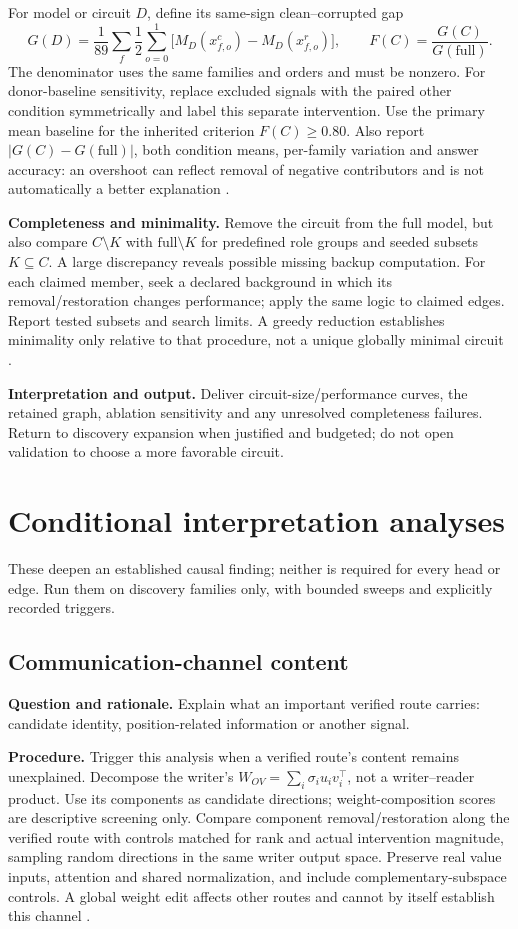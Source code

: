 \documentclass[11pt,a4paper]{article}
\newcommand{\purpose}{\textbf{Question and rationale.} }
\newcommand{\procedure}{\textbf{Procedure.} }
\newcommand{\interpretation}{\textbf{Interpretation and output.} }
\begin{document}
For model or circuit $D$, define its same-sign clean--corrupted gap
\[
 G(D)=\frac1{89}\sum_f\frac12\sum_{o=0}^{1}
 \bigl[M_D(x^c_{f,o})-M_D(x^r_{f,o})\bigr],\qquad
 F(C)=\frac{G(C)}{G(\mathrm{full})}.
\]
The denominator uses the same families and orders and must be nonzero.
For donor-baseline sensitivity, replace excluded signals with the paired other
condition symmetrically and label this separate intervention. Use the primary
mean baseline for the inherited criterion $F(C)\geq0.80$. Also report
$|G(C)-G(\mathrm{full})|$, both condition means, per-family variation and answer
accuracy: an overshoot can reflect removal of negative contributors and is not
automatically a better explanation \cite{faith}.

\textbf{Completeness and minimality.} Remove the circuit from the full model,
but also compare $C\setminus K$ with $\mathrm{full}\setminus K$ for predefined
role groups and seeded subsets $K\subseteq C$. A large discrepancy reveals
possible missing backup computation. For each claimed member, seek a declared
background in which its removal/restoration changes performance; apply the same
logic to claimed edges. Report tested subsets and search limits. A greedy
reduction establishes minimality only relative to that procedure, not a unique
globally minimal circuit \cite{ioi}.

\interpretation Deliver circuit-size/performance curves, the retained graph,
ablation sensitivity and any unresolved completeness failures. Return to
discovery expansion when justified and budgeted; do not open validation to
choose a more favorable circuit.

\section{Conditional interpretation analyses}
These deepen an established causal finding; neither is required for every
head or edge. Run them on discovery families only, with bounded sweeps and
explicitly recorded triggers.

\subsection{Communication-channel content}
\purpose Explain what an important verified route carries: candidate identity,
position-related information or another signal.

\procedure Trigger this analysis when a verified route's content remains
unexplained. Decompose the writer's $W_{OV}=\sum_i\sigma_i u_i v_i^\top$,
not a writer--reader product. Use its components as candidate directions;
weight-composition scores are descriptive screening only. Compare component
removal/restoration along the verified route with controls matched for rank
and actual intervention magnitude, sampling random directions in the same
writer output space. Preserve real value inputs, attention and shared
normalization, and include complementary-subspace controls. A global weight
edit affects other routes and cannot by itself establish this channel
\cite{talking,framework}.
\end{document}
